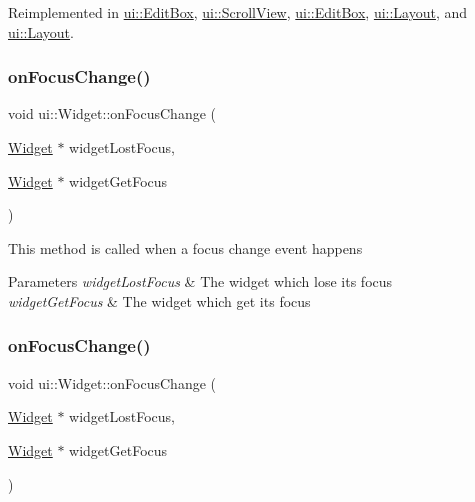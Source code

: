 Reimplemented in \hyperlink{classui_1_1EditBox_a4c5c9db7c8b7711a719aec6a0842696b}{ui\+::\+Edit\+Box}, \hyperlink{classui_1_1ScrollView_a9c9bf9f6d171a618d57c369e53d91a25}{ui\+::\+Scroll\+View}, \hyperlink{classui_1_1EditBox_a4151e7abfe84c879cc89f683c4975285}{ui\+::\+Edit\+Box}, \hyperlink{classui_1_1Layout_ad6be3b3eb4ca53dcbd3eb1ca966299ff}{ui\+::\+Layout}, and \hyperlink{classui_1_1Layout_a6444f3e3f124723e75f80b3d36408e34}{ui\+::\+Layout}.

\mbox{\label{classui_1_1Widget_a316bfe5fc7d6bd1ebab461af4b79f967}} 
\subsubsection{\texorpdfstring{on\+Focus\+Change()}{onFocusChange()}\hspace{0.1cm}{\footnotesize\ttfamily [1/2]}}
{\footnotesize\ttfamily void ui\+::\+Widget\+::on\+Focus\+Change (\begin{DoxyParamCaption}\item[{\hyperlink{classui_1_1Widget}{Widget} $\ast$}]{widget\+Lost\+Focus,  }\item[{\hyperlink{classui_1_1Widget}{Widget} $\ast$}]{widget\+Get\+Focus }\end{DoxyParamCaption})}

This method is called when a focus change event happens 
\begin{DoxyParams}{Parameters}
{\em widget\+Lost\+Focus} & The widget which lose its focus \\
\hline
{\em widget\+Get\+Focus} & The widget which get its focus \\
\hline
\end{DoxyParams}
\mbox{\label{classui_1_1Widget_a316bfe5fc7d6bd1ebab461af4b79f967}} 
\subsubsection{\texorpdfstring{on\+Focus\+Change()}{onFocusChange()}\hspace{0.1cm}{\footnotesize\ttfamily [2/2]}}
{\footnotesize\ttfamily void ui\+::\+Widget\+::on\+Focus\+Change (\begin{DoxyParamCaption}\item[{\hyperlink{classui_1_1Widget}{Widget} $\ast$}]{widget\+Lost\+Focus,  }\item[{\hyperlink{classui_1_1Widget}{Widget} $\ast$}]{widget\+Get\+Focus }\end{DoxyParamCaption})}

